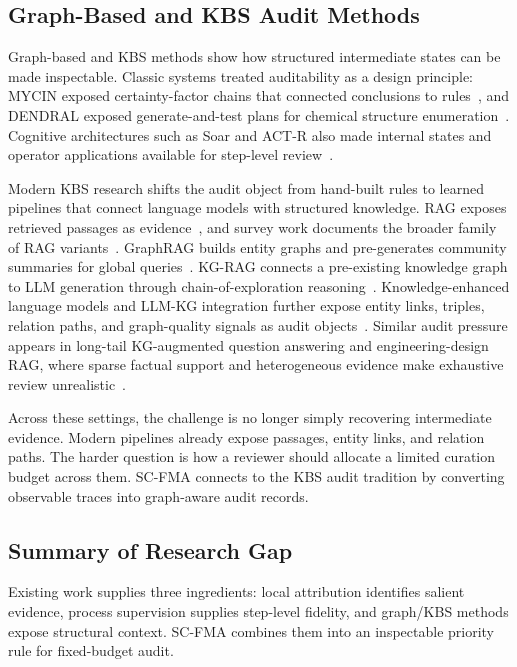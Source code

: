\documentclass[a4paper,fleqn]{cas-sc}
\begin{document}
\subsection{Graph-Based and KBS Audit Methods}

Graph-based and KBS methods show how structured intermediate states can be made inspectable. Classic systems treated auditability as a design principle: MYCIN exposed certainty-factor chains that connected conclusions to rules~\cite{buchanan1984mycin}, and DENDRAL exposed generate-and-test plans for chemical structure enumeration~\cite{lindsay1980dendral}. Cognitive architectures such as Soar and ACT-R also made internal states and operator applications available for step-level review~\cite{laird2012soar,anderson2004actr}.

Modern KBS research shifts the audit object from hand-built rules to learned pipelines that connect language models with structured knowledge. RAG exposes retrieved passages as evidence~\cite{lewis2020rag}, and survey work documents the broader family of RAG variants~\cite{gao2023ragsurvey}. GraphRAG builds entity graphs and pre-generates community summaries for global queries~\cite{edge2024graphrag}. KG-RAG connects a pre-existing knowledge graph to LLM generation through chain-of-exploration reasoning~\cite{sanmartin2024kgrag}. Knowledge-enhanced language models and LLM-KG integration further expose entity links, triples, relation paths, and graph-quality signals as audit objects~\cite{hu2024knowledgeenhanced,pan2024unifying,yang2025kbllmsurvey,chen2025kgquality,dai2025llmkg}. Similar audit pressure appears in long-tail KG-augmented question answering and engineering-design RAG, where sparse factual support and heterogeneous evidence make exhaustive review unrealistic~\cite{huang2025prompting,siddharth2024retrieval,liu2025knowledgereasoning}.

Across these settings, the challenge is no longer simply recovering intermediate evidence. Modern pipelines already expose passages, entity links, and relation paths. The harder question is how a reviewer should allocate a limited curation budget across them. SC-FMA connects to the KBS audit tradition by converting observable traces into graph-aware audit records.

\subsection{Summary of Research Gap}

Existing work supplies three ingredients: local attribution identifies salient evidence, process supervision supplies step-level fidelity, and graph/KBS methods expose structural context. SC-FMA combines them into an inspectable priority rule for fixed-budget audit.
\end{document}
